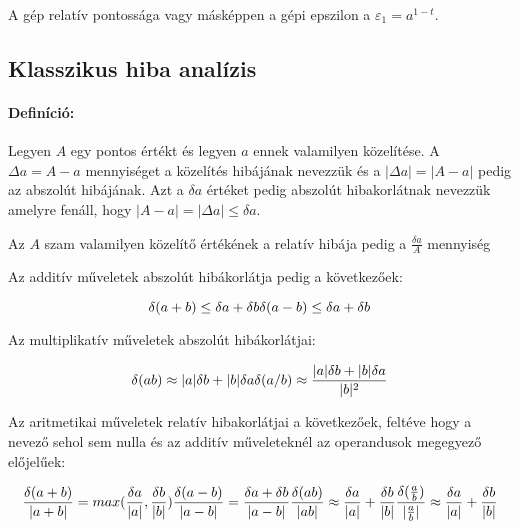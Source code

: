 A gép relatív pontossága vagy másképpen a gépi epszilon a
\(\varepsilon_1=a^{1-t}.\)

    \subsection{Klasszikus hiba analízis}\label{klasszikus-hiba-analuxedzis}

\paragraph{Definíció:}\label{definuxedciuxf3}

Legyen \(A\) egy pontos értékt és legyen \(a\) ennek valamilyen
közelítése. A \(\Delta a=A-a\) mennyiséget a közelítés hibájának
nevezzük és a \(|\Delta a|=|A-a|\) pedig az abszolút hibájának. Azt a
\(\delta a\) értéket pedig abszolút hibakorlátnak nevezzük amelyre
fenáll, hogy \(|A-a|=|\Delta a| \leq \delta a\).

Az \(A\) szam valamilyen közelítő értékének a relatív hibája pedig a
\(\frac {\delta a} {A}\) mennyiség

Az additív műveletek abszolút hibákorlátja pedig a következőek:

\[
\delta(a+b)\leq \delta a+ \delta b \\
\delta(a-b)\leq \delta a+ \delta b
\]

Az multiplikatív műveletek abszolút hibákorlátjai:

\[
\delta(ab) \approx |a|\delta b +|b| \delta a \\
\delta(a/b) \approx  \frac {|a|\delta b +|b| \delta a}{|b|^2}
\]

Az aritmetikai műveletek relatív hibakorlátjai a következőek, feltéve
hogy a nevező sehol sem nulla és az additív műveleteknél az operandusok
megegyező előjelűek:

\[
\frac{\delta(a+b)} {|a+b|} =  max( \frac{\delta a}{|a|}, \frac{\delta b}{|b|} ) \\
\frac{\delta(a-b)} {|a-b|} = \frac{\delta a + \delta b} {|a-b|} \\
\frac{\delta(ab)} {|ab|} \approx \frac{\delta a}{|a|} + \frac{\delta b}{|b|} \\
\frac{\delta(\frac {a}{b})} {|\frac {a}{b}|} \approx \frac{\delta a}{|a|} + \frac{\delta b}{|b|}
\]
